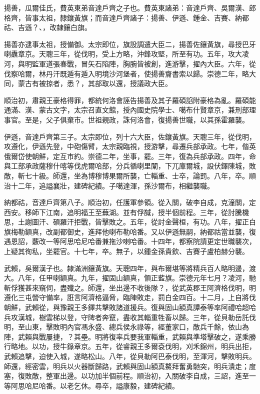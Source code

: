 \begin{pinyinscope}
揚善，瓜爾佳氏，費英東弟音達戶齊之子也。費英東諸弟：音達戶齊、吳爾漢、郎格齊，皆事太祖，隸鑲黃旗；而音達戶齊諸子：揚善、伊遜、鍾金、吉賽、納都祜、吉遜？、，改隸鑲白旗。

揚善亦逮事太祖，授備御。太宗即位，旗設調遣大臣二，揚善佐鑲黃旗，尋授巴牙喇纛章京。天聰三年，從伐明，受上方略，沖鋒攻堅，所至有功。五年，攻大凌河，與明監軍道張春戰，冒矢石陷陣，胸腕皆被創，進游擊，擢內大臣。六年，從伐察哈爾，林丹汗既遁有遁入明境沙河堡者，使揚善齎書索以歸。崇德二年，略大同，蒙古有被掠者，悉？，其部取以還，授議政大臣。

順治初，肅親王豪格得罪，都統何洛會誣告揚善及其子羅碩諂附豪格為亂。羅碩能通滿、漢、蒙古文字，太宗召直文館，授內國史院學士、噶布什賢章京，兼刑部理事官。至是，父子俱棄市。世祖親政，誅何洛會，復揚善世職，以其孫霍羅襲。

伊遜，音達戶齊第三子。太宗即位，列十六大臣，佐鑲黃旗。天聰三年，從伐明，攻遵化，伊遜先登，中砲傷臂，太宗親臨視，授游擊，尋遷兵部承政。七年，偕英俄爾岱使朝鮮，定互市約。崇德二年，坐事，罷。三年，復為兵部承政。四年，命與工部承政薩穆什喀等伐虎爾哈部，分兵循喇里闡，下兀庫爾城，設伏鐸陳城，敗敵，斬七十級。師還，坐為博穆博果爾所襲，亡輜重、士卒，論罰。八年，卒。順治十二年，追謚襄壯，建碑紀績。子噶達渾，孫沙爾布，相繼襲職。

納都祜，音達戶齊第八子。順治初，任護軍參領。從入關，破李自成，克潼關，定西安。移師下江南，追明福王至蕪湖。並有俘馘，授半個前程。三年，從討騰機思，土謝圖汗、碩羅汗拒戰，皆擊敗之。五年，從討金聲桓，有功。八年，擢正白旗梅勒額真，改副都御史，進拜他喇布勒哈番。又以伊遜無嗣，納都祜當並襲，復遇恩詔，覈改一等阿思哈尼哈番兼拖沙喇哈番。十四年，都察院請更定世職襲次，上疑其徇私，坐罷官。十七年，卒。無子，以鍾金孫貴欽、吉賽子盧柏赫分襲。

武賴，吳爾漢子也。隸滿洲鑲黃旗。天聰四年，與布爾堪等將精兵百人略明邊，渡大。八年，任甲喇額真。九年，擢固山額真，領正藍旗。崇德元年七月？凌河，馳斬俘獲甚來窺伺，盡殲之。師還，坐出邊不收後隊？，從武英郡王阿濟格伐明，明遵化三屯營守備率，誑言阿濟格逼脅，臨陣敗走，罰白金四百。十二月，上自將伐朝鮮，武賴從，與豫親王多鐸共擊敗諸道援兵。復與固山額真譚泰等率阿禮哈超哈兵攻漢城，樹雲梯以登，守陴者奔竄，盡收其輜重牲畜以歸。三年，從貝勒岳託伐明，至山東，擊敗明內官馮永盛、總兵侯永祿等，經董家口，敵兵千餘，依山為陣，武賴與戰屢捷，？其壘。明將復率兵要我軍輜重，武賴與準塔擊破之，遂乘勝行略地。以功，授牛錄章京。五年，從睿親王多爾袞伐明，刈禾錦州，明兵出拒，武賴追擊，迫使入城，遂略松山。八年，從貝勒阿巴泰伐明，至渾河，擊敗明兵。師還，經密雲，明兵以火器斷歸路，武賴與固山額真鰲拜奮勇馳突，明兵潰走；度塞，復敗敵，整軍出邊。以功加半個前程。順治初，入關破李自成，三詔，進至一等阿思哈尼哈番。以老乞休。尋卒，謚康毅，建碑紀績。


\end{pinyinscope}
